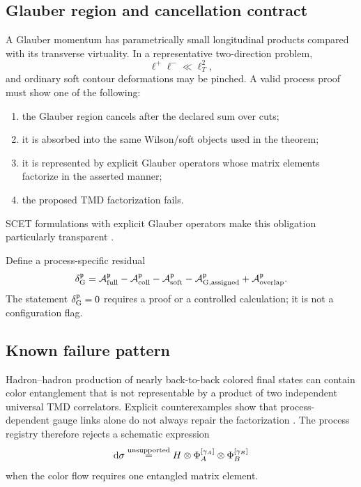 \documentclass[11pt]{article}
\newcommand{\dd}{\mathrm{d}}
\newcommand{\cA}{\mathcal A}
\newcommand{\soft}{\mathrm{soft}}
\begin{document}
\subsection{Glauber region and cancellation contract}

A Glauber momentum has parametrically small longitudinal products compared
with its transverse virtuality.  In a representative two-direction problem,
\begin{equation}
 \ell^+\ell^-\ll \ell_T^2,
\label{eq:glauber-region}
\end{equation}
and ordinary soft contour deformations may be pinched.  A valid process proof
must show one of the following:
\begin{enumerate}
\item the Glauber region cancels after the declared sum over cuts;
\item it is absorbed into the same Wilson/soft objects used in the theorem;
\item it is represented by explicit Glauber operators whose matrix elements
      factorize in the asserted manner;
\item the proposed TMD factorization fails.
\end{enumerate}
SCET formulations with explicit Glauber operators make this obligation
particularly transparent \cite{RothsteinStewart2016}.

Define a process-specific residual
\begin{equation}
 \delta_{\rm G}^{\mathfrak p}
 =\cA_{\rm full}^{\mathfrak p}
 -\cA_{\rm coll}^{\mathfrak p}
 -\cA_{\soft}^{\mathfrak p}
 -\cA_{\rm G,assigned}^{\mathfrak p}
 +\cA_{\rm overlap}^{\mathfrak p}.
\label{eq:glauber-residual}
\end{equation}
The statement \(\delta_{\rm G}^{\mathfrak p}=0\) requires a proof or a
controlled calculation; it is not a configuration flag.

\subsection{Known failure pattern}

Hadron--hadron production of nearly back-to-back colored final states can
contain color entanglement that is not representable by a product of two
independent universal TMD correlators.  Explicit counterexamples show that
process-dependent gauge links alone do not always repair the factorization
\cite{CollinsQiu2007,RogersMulders2010}.  The process registry therefore
rejects a schematic expression
\begin{equation}
 \dd\sigma
 \stackrel{\rm unsupported}{=}
 H\otimes \Phi_{A}^{[\gamma_A]}
   \otimes \Phi_{B}^{[\gamma_B]}
\label{eq:unsupported-factorization}
\end{equation}
when the color flow requires one entangled matrix element.
\end{document}
